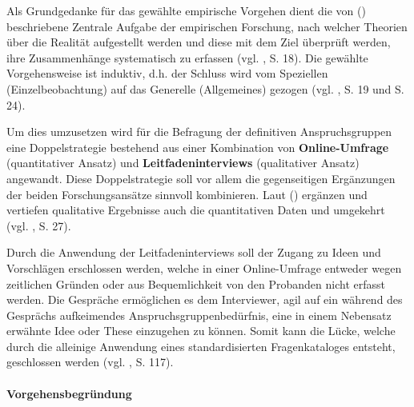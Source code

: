 \documentclass[../../main.tex]{subfiles}
\begin{document}
\begin{sloppypar}
Als Grundgedanke für das gewählte empirische Vorgehen dient die von \citeauthor{mayer_interview_2013} (\citeyear{mayer_interview_2013}) beschriebene Zentrale Aufgabe der empirischen Forschung, nach welcher Theorien über die Realität aufgestellt werden und diese mit dem Ziel überprüft werden, ihre Zusammenhänge systematisch zu erfassen (vgl. \cite{mayer_interview_2013}, S. 18). Die gewählte Vorgehensweise ist induktiv, d.h. der Schluss wird vom Speziellen (Einzelbeobachtung) auf das Generelle (Allgemeines) gezogen (vgl. \cite{mayer_interview_2013}, S. 19 und S. 24).

Um dies umzusetzen wird für die Befragung der definitiven Anspruchsgruppen eine Doppelstrategie bestehend aus einer Kombination von \textbf{Online-Umfrage} (quantitativer Ansatz) und \textbf{Leitfadeninterviews} (qualitativer Ansatz) angewandt. Diese Doppelstrategie soll vor allem die gegenseitigen Ergänzungen der beiden Forschungsansätze sinnvoll kombinieren. Laut (\cite{mayer_interview_2013}) ergänzen und vertiefen qualitative Ergebnisse auch die quantitativen Daten und umgekehrt (vgl. \cite{mayer_interview_2013}, S. 27).

Durch die Anwendung der Leitfadeninterviews soll der Zugang zu Ideen und Vorschlägen erschlossen werden, welche in einer Online-Umfrage entweder wegen zeitlichen Gründen oder aus Bequemlichkeit von den Probanden nicht erfasst werden. Die Gespräche ermöglichen es dem Interviewer, agil auf ein während des Gesprächs aufkeimendes Anspruchsgruppenbedürfnis, eine in einem Nebensatz erwähnte Idee oder These einzugehen zu können. Somit kann die Lücke, welche durch die alleinige Anwendung eines standardisierten Fragenkataloges entsteht, geschlossen werden (vgl. \cite{berekoven_marktforschung:_2009}, S. 117).

\end{sloppypar}

\paragraph*{Vorgehensbegründung}\mbox{}
\end{document}
